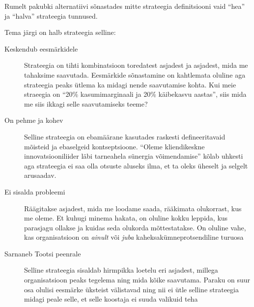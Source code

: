 Rumelt pakubki alternatiivi sõnastades mitte strateegia definitsiooni vaid \enquote{hea} ja \enquote{halva} strateegia tunnused. 

Tema järgi on halb strateegia selline:
\begin{description}
	\item[Keskendub eesmärkidele] Strateegia on tihti kombinatsioon toredatest asjadest ja asjadest, mida me tahaksime saavutada. Eesmärkide sõnastamine on kahtlemata oluline aga strateegia peaks ütlema ka midagi nende saavutamise kohta. Kui meie straeegia on \enquote{20\% kasumimarginaali ja 20\% käibekasvu aastas}, siis mida me siis ikkagi selle saavutamiseks teeme?
	\item[On pehme ja kohev] Selline strateegia on ebamäärane kasutades raskesti defineeritavaid mõisteid ja ebaselgeid kontseptsioone. \enquote{Oleme kliendikeskne innovatsiooniliider läbi tarneahela sünergia võimendamise} kõlab uhkesti aga strateegia ei saa olla otsuste aluseks ilma, et ta oleks üheselt ja selgelt arusaadav. 
	\item[Ei sisalda probleemi] Räägitakse asjadest, mida me loodame saada, rääkimata olukorrast, kus me oleme. Et kuhugi minema hakata, on oluline kokku leppida, kus parasjagu ollakse ja kuidas seda olukorda mõttestatakse. On oluline vahe, kas organisatsioon on \emph{ainult} või \emph{juba} kaheksakümneprotsendiline turuosa
	\item[Sarnaneb Tootsi peenrale] Selline strateegia sisaldab hirmpikka loetelu eri asjadest, millega organisatsioon peaks tegelema ning mida kõike saavutama. Paraku on suur osa olulisi eesmärke üksteist välistavad ning nii ei ütle selline strateegia midagi peale selle, et selle koostaja ei suuda valikuid teha
\end{description}

